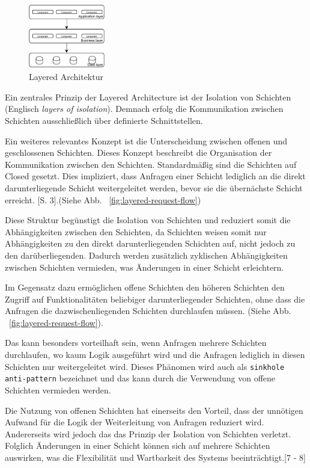\documentclass[acmtog]{acmart}
\begin{document}
\begin{figure}[h!]
    \centering
    \includegraphics[width=0.3\textwidth]{images/layer.pdf}
    \caption{Layered Architektur}
    \label{fig:layered}
\end{figure}

Ein zentrales Prinzip der Layered Architecture ist der Isolation von Schichten (Englisch \textit{layers of isolation}).
Demnach erfolg die Kommunikation zwischen Schichten ausschließlich über definierte Schnittstellen.
\cite[10]{layered}

Ein weiteres relevantes Konzept ist die Unterscheidung zwischen offenen und geschlossenen Schichten.
Dieses Konzept beschreibt die Organisation der Kommunikation zwischen den Schichten.
Standardmäßig sind die Schichten auf Closed gesetzt.
Dies impliziert, dass Anfragen einer Schicht lediglich an die direkt darunterliegende Schicht weitergeleitet werden,
bevor sie die übernächste Schicht erreicht.
\cite{layered}[S. 3].(Siehe Abb. ~\ref{fig:layered-request-flow})

Diese Struktur begünstigt die Isolation von Schichten und reduziert somit die Abhängigkeiten zwischen den Schichten, da
 Schichten weisen somit nur Abhängigkeiten zu den direkt darunterliegenden Schichten auf, nicht jedoch zu den darüberliegenden.
Dadurch werden zusätzlich zyklischen Abhängigkeiten zwischen Schichten vermieden, was Änderungen in einer Schicht erleichtern.

Im Gegensatz dazu ermöglichen offene Schichten den höheren Schichten den Zugriff auf Funktionalitäten
beliebiger darunterliegender Schichten, ohne dass die Anfragen die dazwischenliegenden Schichten durchlaufen müssen.
(Siehe Abb. ~\ref{fig:layered-request-flow}). \cite[4]{layered}

Das kann besonders vorteilhaft sein, wenn Anfragen mehrere Schichten durchlaufen,
wo kaum Logik ausgeführt wird und die Anfragen lediglich in diesen Schichten nur weitergeleitet wird.
Dieses Phänomen wird auch als \texttt{sinkhole anti-pattern} bezeichnet und das kann durch die
Verwendung von offene Schichten vermieden werden.

Die Nutzung von offenen Schichten hat einerseits den Vorteil, dass der unnötigen Aufwand für die Logik der Weiterleitung von Anfragen reduziert wird.
Andererseits wird jedoch das das Prinzip der Isolation von Schichten verletzt.
Folglich Änderungen in einer Schicht können sich auf mehrere Schichten auswirken, was die Flexibilität und Wartbarkeit
des Systems beeinträchtigt.[7 - 8]\cite{layered}
\end{document}
